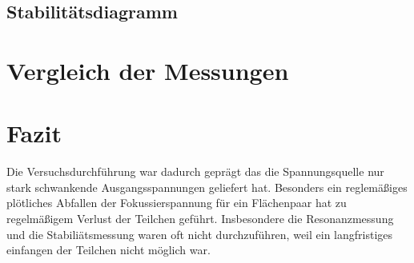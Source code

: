 \documentclass[a4paper,12pt]{article}
\begin{document}
\subsection{Stabilitätsdiagramm}



\section{Vergleich der Messungen}

\section{Fazit}
Die Versuchsdurchführung war dadurch geprägt das die Spannungsquelle nur stark schwankende Ausgangsspannungen geliefert hat. Besonders ein reglemäßiges plötliches Abfallen der Fokussierspannung für ein 
Flächenpaar hat zu regelmäßigem Verlust der Teilchen geführt. Insbesondere die Resonanzmessung und die Stabiliätsmessung waren oft nicht durchzuführen, weil ein langfristiges einfangen der Teilchen nicht
möglich war.

\end{document}
